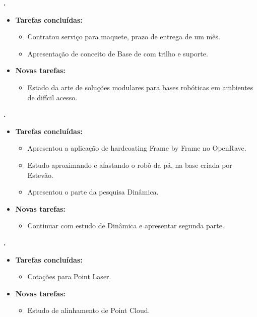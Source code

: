 					
			
   \textbf{.} 
	\begin{itemize}
		\item \textbf{Tarefas concluídas:}
			\begin{itemize}  
			  \item Contratou serviço para maquete, prazo de entrega de um mês.
			  \item Apresentação de conceito de Base de com trilho e suporte.
			\end{itemize}
		
		\item \textbf{Novas tarefas:}
			\begin{itemize} 
				\item Estado da arte de soluções modulares para bases robóticas em ambientes de difícil acesso.
			\end{itemize}
	\end{itemize}

	  \textbf{\renan.} 
	\begin{itemize}
		\item \textbf{Tarefas concluídas:}
			\begin{itemize}    
				\item Apresentou a aplicação de hardcoating Frame by Frame no OpenRave. 
				\item Estudo aproximando e afastando o robô da pá, na base criada por
				Estevão.
				\item Apresentou o parte da pesquisa Dinâmica.
			\end{itemize}
		
		\item \textbf{Novas tarefas:}
			\begin{itemize} 
			    \item Continuar com estudo de Dinâmica e apresentar segunda parte.
			\end{itemize}
	\end{itemize}	
	
	
	  \textbf{\elael.} 
	\begin{itemize}
		\item \textbf{Tarefas concluídas:}
			\begin{itemize}    
				\item Cotações para Point Laser. 
			\end{itemize}
		
		\item \textbf{Novas tarefas:}
			\begin{itemize} 
			    \item Estudo de alinhamento de Point Cloud.
			\end{itemize}
	\end{itemize}			
			
